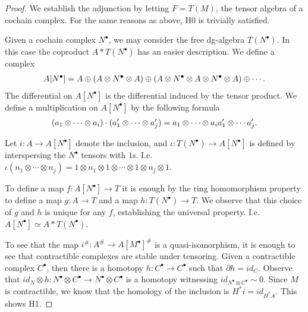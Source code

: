 \documentclass[../thesis.tex]{subfiles}
\begin{document}
            \begin{proof}
                We establish the adjunction by letting $F = T(M)$, the tensor algebra of a cochain complex. For the same reasons as above, H0 is trivially satisfied. 

                Given a cochain complex $N^\bullet$, we may consider the free dg-algebra $T(N^\bullet)$. In this case the coproduct $A\ast T(N^\bullet)$ has an easier description. We define a complex
                \begin{align*}
                    A[N^\bullet] = A \oplus (A \otimes N^\bullet \otimes A) \oplus (A \otimes N^\bullet \otimes A \otimes N^\bullet \otimes A) \oplus \cdots\tt{.}
                \end{align*}
                The differential on $A[N^\bullet]$ is the differential induced by the tensor product. We define a multiplication on $A[N^\bullet]$ by the following formula
                \begin{align*}
                    (a_1\otimes\cdots\otimes a_i)\cdot(a_1'\otimes\cdots\otimes a_j') = a_1\otimes\cdots\otimes a_ia_1'\otimes\cdots a_j'\tt{.}
                \end{align*}

                Let $i : A \rightarrow A[N^\bullet]$ denote the inclusion, and $\iota : T(N^\bullet) \rightarrow A[N^\bullet]$ is defined by interspersing the $N^\bullet$ tensors with $1$s. I.e. $\iota(n_1\otimes\cdots\otimes n_j) = 1 \otimes n_1 \otimes 1 \otimes \cdots \otimes 1 \otimes n_j \otimes 1$.

                To define a map $f : A[N^\bullet] \rightarrow T$ it is enough by the ring homomorphism property to define a map $g : A \rightarrow T$ and a map $h : T(N^\bullet) \rightarrow T$. We observe that this choice of $g$ and $h$ is unique for any $f$, establishing the universal property. I.e. $A[N^\bullet] \simeq A\ast T(N^\bullet)$.
                
                To see that the map $i^\# : A^\# \rightarrow A[M^\bullet]^\#$ is a quasi-isomorphism, it is enough to see that contractible complexes are stable under tensoring. Given a contractible complex $C^\bullet$, then there is a homotopy $h : C^\bullet \rightarrow C^\bullet$ such that $\partial h = id_C$. Observe that $id_N\otimes h : N^\bullet\otimes C^\bullet \rightarrow N^\bullet\otimes C^\bullet$ is a homotopy witnessing $id_{N^\bullet\otimes C^\bullet} \sim 0$. Since $M$ is contractible, we know that the homology of the inclusion is $H^*i = id_{H^*A}$. This shows H1.
            \end{proof}
\end{document}
